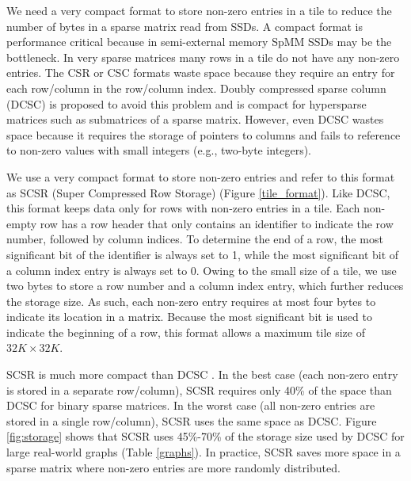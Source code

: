 We need a very compact format to store non-zero entries in a tile to reduce
the number of bytes in a sparse matrix read from SSDs. A compact format is
performance critical because in semi-external memory SpMM SSDs
may be the bottleneck. In very sparse matrices many rows in a tile
do not have any non-zero entries. The CSR or CSC formats waste space because
they require an entry for each row/column in the row/column index. Doubly
compressed sparse column (DCSC) \cite{Buluc08} is proposed to avoid this problem
and is compact for hypersparse matrices such as submatrices of a sparse matrix.
However, even DCSC wastes space because it requires the storage of
pointers to columns and fails to reference to non-zero values with small
integers (e.g., two-byte integers).

We use a very compact format to store non-zero entries and refer to this
format as SCSR (Super Compressed Row Storage) (Figure \ref{tile_format}).
Like DCSC, this format keeps data only for rows with non-zero entries in a tile.
Each non-empty row has a row header that only contains an identifier
to indicate the row number, followed by column indices. To determine the end
of a row, the most significant bit of the identifier is always set to 1, while
the most significant bit of a column index entry is always set to 0.
Owing to the small size of a tile, we use two bytes to store a row
number and a column index entry, which further reduces the storage size. As such,
each non-zero entry requires at most four bytes to indicate its location in
a matrix. Because the most significant bit is used to indicate the beginning
of a row, this format allows a maximum tile size of $32K \times 32K$.

SCSR is
much more compact than DCSC \cite{Buluc08}. In the best case (each non-zero
entry is stored in a separate row/column), SCSR requires only 40\% of the space
than DCSC for binary sparse matrices. In the worst case (all non-zero entries
are stored in a single row/column), SCSR uses the same space as DCSC. Figure
\ref{fig:storage} shows that SCSR uses 45\%-70\% of the storage size used by
DCSC for large real-world graphs (Table \ref{graphs}). In practice, SCSR saves
more space
in a sparse matrix where non-zero entries are more randomly distributed.

